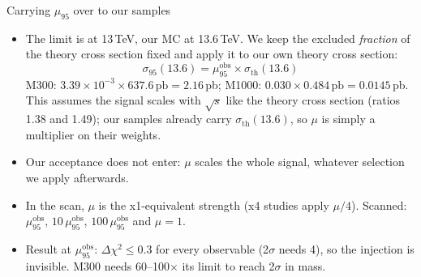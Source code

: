 \documentclass[aspectratio=169,11pt]{beamer}
\newcommand{\muobs}{\mu_{95}^{\text{obs}}}
\begin{document}
\begin{frame}{Carrying $\mu_{95}$ over to our samples}
  \begin{itemize}
    \item The limit is at 13\,TeV, our MC at 13.6\,TeV. We keep the excluded
          \emph{fraction} of the theory cross section fixed and apply it to our
          own theory cross section:
          \[ \sigma_{95}(13.6) = \muobs \times \sigma_{\text{th}}(13.6) \]
          M300: $3.39\times10^{-3} \times 637.6\,\text{pb} = 2.16$\,pb;
          M1000: $0.030 \times 0.484\,\text{pb} = 0.0145$\,pb.
          This assumes the signal scales with $\sqrt{s}$ like the theory cross
          section (ratios 1.38 and 1.49); our samples already carry
          $\sigma_{\text{th}}(13.6)$, so $\mu$ is simply a multiplier on their weights.
    \item Our acceptance does not enter: $\mu$ scales the whole signal, whatever
          selection we apply afterwards.
    \item In the scan, $\mu$ is the x1-equivalent strength (x4 studies apply
          $\mu/4$). Scanned: $\muobs$, $10\,\muobs$, $100\,\muobs$ and $\mu = 1$.
    \item Result at $\muobs$: $\Delta\chi^2 \le 0.3$ for every observable
          (2$\sigma$ needs 4), so the injection is invisible. M300 needs
          60--100$\times$ its limit to reach 2$\sigma$ in mass.
  \end{itemize}
\end{frame}
\end{document}
